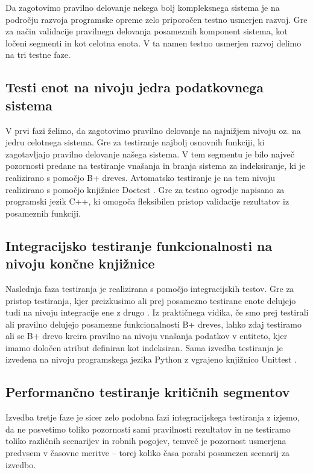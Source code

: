 \documentclass[a4paper,12pt,openright]{book}
\begin{document}
    Da zagotovimo pravilno delovanje nekega bolj kompleksnega sistema je na področju razvoja programske opreme zelo priporočen testno usmerjen razvoj. Gre za način validacije pravilnega delovanja posameznih komponent sistema, kot ločeni segmenti in kot celotna enota. V ta namen testno usmerjen razvoj delimo na tri testne faze. 
   
   \subsection{Testi enot na nivoju jedra podatkovnega sistema}

    V prvi fazi želimo, da zagotovimo pravilno delovanje na najnižjem nivoju oz. na jedru celotnega sistema. Gre za testiranje najbolj osnovnih funkciji, ki zagotavljajo pravilno delovanje našega sistema. V tem segmentu je bilo največ pozornosti predane na testiranje vnašanja in branja sistema za indeksiranje, ki je realizirano s pomočjo B+ dreves. Avtomatsko testiranje je na tem nivoju realizirano s pomočjo knjižnice Doctest \cite{DOCTEST_GITHUB}. Gre za testno ogrodje napisano za programski jezik C++, ki omogoča fleksibilen pristop validacije rezultatov iz posameznih funkciji.
   
   \subsection{Integracijsko testiranje funkcionalnosti na nivoju končne knjižnice}

    Naslednja faza testiranja je realizirana s pomočjo integracijskih testov. Gre za pristop testiranja, kjer preizkusimo ali prej posamezno testirane enote delujejo tudi na nivoju integracije ene z drugo \cite{brar2015differentiating}. Iz praktičnega vidika, če smo prej testirali ali pravilno delujejo posamezne funkcionalnosti B+ dreves, lahko zdaj testiramo ali se B+ drevo kreira pravilno na nivoju vnašanja podatkov v entiteto, kjer imamo določen atribut definiran kot indeksiran. Sama izvedba testiranja je izvedena na nivoju programskega jezika Python z vgrajeno knjižnico Unittest \cite{PY_UNITTEST}.
   
   \subsection{Performančno testiranje kritičnih segmentov}

    Izvedba tretje faze je sicer zelo podobna fazi integracijskega testiranja z izjemo, da ne posvetimo toliko pozornosti sami pravilnosti rezultatov in ne testiramo toliko različnih scenarijev in robnih pogojev, temveč je pozornost usmerjena predvsem v časovne meritve – torej koliko časa porabi posamezen scenarij za izvedbo.
   
\end{document}
